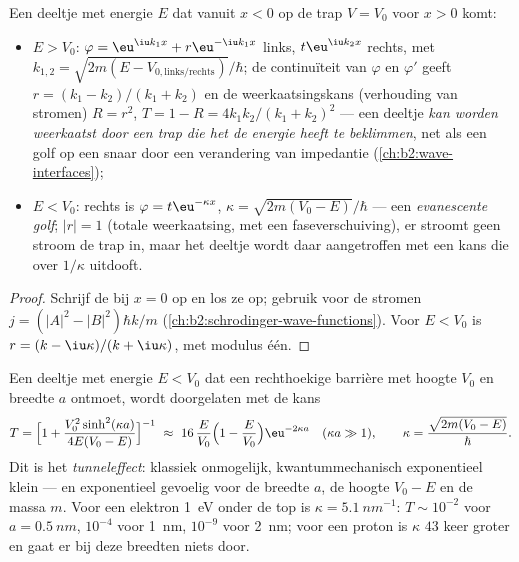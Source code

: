 \begin{proposition}[Potentiaaltrap]\label{prop:b2:potential-wells-tunneling:step}
Een deeltje met energie $E$ dat vanuit $x < 0$ op de trap $V = V_0$
voor $x > 0$ komt:
\begin{itemize}
\item $E > V_0$: $\varphi = \eu^{\iu k_1x} + r\eu^{-\iu k_1x}$ links,
        $t\eu^{\iu
      k_2x}$ rechts, met
        $k_{1,2} = \sqrt{2m(E - V_{0,\text{links/rechts}})}/
      \hbar$; de
        continuïteit van $\varphi$ en $\varphi'$ geeft
        $r = (k_1 - k_2)/(k_1
      + k_2)$ en de weerkaatsingskans
        (verhouding van stromen) $R = r^2$,
      $T = 1 - R = 4k_1k_2/(k_1 + k_2)^2$ --- een deeltje \emph{kan worden
      weerkaatst door een trap die het de energie heeft te beklimmen}, net
      als een golf op
      een snaar door een verandering van impedantie (\cref{ch:b2:wave-interfaces});
\item $E < V_0$: rechts is $\varphi = t\eu^{-\kappa x}$,
        $\kappa = \sqrt{2m(V_0
      - E)}/\hbar$ --- een \emph{evanescente
        golf}; $|r| = 1$ (totale weerkaatsing, met een faseverschuiving),
      er stroomt geen
      stroom de trap in, maar het deeltje wordt daar aangetroffen met een
      kans die over $1/\kappa$ uitdooft.
\end{itemize}
\end{proposition}

\begin{proof}
Schrijf de  bij $x = 0$ op en los ze op; gebruik
voor de stromen
$j = (|A|^2 - |B|^2)\hbar k/m$ (\cref{ch:b2:schrodinger-wave-functions}).
Voor $E < V_0$ is $r = (k - \iu\kappa)/(k + \iu\kappa)$, met modulus één.
\end{proof}

\begin{theorem}\label{thm:b2:potential-wells-tunneling:tunnel}
Een deeltje met energie $E < V_0$ dat een rechthoekige barrière met hoogte
$V_0$ en breedte $a$ ontmoet, wordt doorgelaten met de kans
\[
T = \Big[1 + \frac{V_0^2\sinh^2(\kappa a)}{4E(V_0 - E)}\Big]^{-1}
\ \approx\ 16\,\frac{E}{V_0}\Big(1 - \frac{E}{V_0}\Big)\eu^{-2\kappa a}
\quad (\kappa a \gg 1), \qquad
\kappa = \frac{\sqrt{2m(V_0 - E)}}{\hbar} .
\]
Dit is het \emph{tunneleffect}: klassiek
onmogelijk, kwantummechanisch exponentieel klein --- en
exponentieel gevoelig voor de breedte $a$, de hoogte $V_0 - E$ en de
massa $m$. Voor een elektron \qty{1}{eV} onder de top is
$\kappa = \qty{5.1}{nm^{-1}}$:
$T \sim 10^{-2}$ voor $a = \qty{0.5}{nm}$, $10^{-4}$ voor \qty{1}{nm},
$10^{-9}$ voor
\qty{2}{nm}; voor een proton is $\kappa$ $43$ keer groter en gaat er bij
deze breedten
niets door.
\end{theorem}

